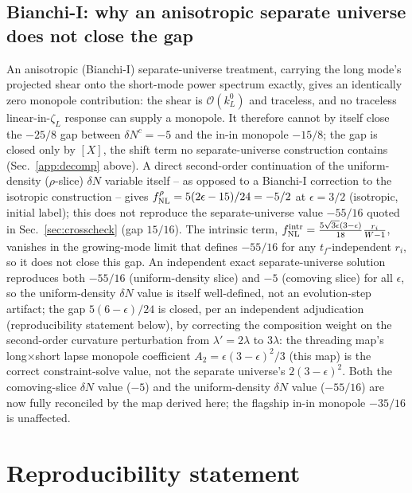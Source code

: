\documentclass[aps,prd,twocolumn,superscriptaddress,nofootinbib,longbibliography]{revtex4-2}
\begin{document}
\subsection{Bianchi-I: why an anisotropic separate universe does not close the gap}
\label{app:bianchi}

An anisotropic (Bianchi-I) separate-universe treatment, carrying the long
mode's projected shear onto the short-mode power spectrum exactly, gives an
identically zero monopole contribution: the shear is $\mathcal O(k_L^0)$ and
traceless, and no traceless linear-in-$\zeta_L$ response can supply a
monopole. It therefore cannot by itself close the $-25/8$ gap between
$\delta N^c=-5$ and the in-in monopole $-15/8$; the gap is closed only by
$[X]$, the shift term no separate-universe construction contains
(Sec.~\ref{app:decomp} above). A direct second-order continuation of the
uniform-density ($\rho$-slice) $\delta N$ variable itself -- as opposed to a
Bianchi-I correction to the isotropic construction -- gives
$f_{\rm NL}^\rho=5(2\epsilon-15)/24=-5/2$ at $\epsilon=3/2$ (isotropic, initial
label); this does not reproduce the separate-universe value $-55/16$ quoted
in Sec.~\ref{sec:crosscheck} (gap $15/16$). The intrinsic term,
$f^{\rm intr}_{\rm NL}=\tfrac{5\sqrt{3\epsilon}(3-\epsilon)}{18}\tfrac{r_i}{W-1}$, vanishes
in the growing-mode limit that defines $-55/16$ for any $t_f$-independent $r_i$, so it does
not close this gap. An independent exact separate-universe solution reproduces
both $-55/16$ (uniform-density slice) and $-5$ (comoving slice) for all
$\epsilon$, so the uniform-density $\delta N$ value is itself well-defined, not
an evolution-step artifact; the gap $5(6-\epsilon)/24$ is closed, per an independent
adjudication (reproducibility statement below),
by correcting the composition weight on the second-order curvature perturbation from
$\lambda'=2\lambda$ to $3\lambda$: the threading map's long$\times$short lapse monopole
coefficient $A_2=\epsilon(3-\epsilon)^2/3$ (this map) is the correct constraint-solve
value, not the separate universe's $2(3-\epsilon)^2$. Both
the comoving-slice $\delta N$ value ($-5$) and the uniform-density $\delta N$ value
($-55/16$) are now fully reconciled by the map derived here; the flagship in-in
monopole $-35/16$ is unaffected.

\section*{Reproducibility statement}
\sloppy
\end{document}
